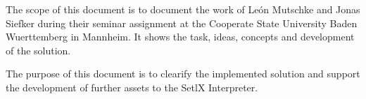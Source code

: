 

	The scope of this document is to document the work of León Mutschke and Jonas Siefker during their seminar assignment at the Cooperate State University Baden Wuerttemberg in Mannheim. It shows the task, ideas, concepts and development of the solution.

	The purpose of this document is to clearify the implemented solution and support the development of further assets to the SetlX Interpreter.
